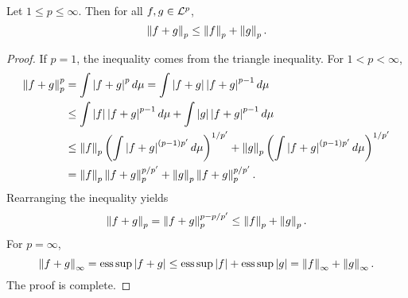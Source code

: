 \begin{theorem}
    Let $1\leq p\leq\infty$. Then for all $f,g\in\mathcal{L}^p$, 
    \begin{equation*}
        \left\lVert {f+g} \right\rVert_p \leq \left\lVert {f} \right\rVert_p + \left\lVert {g} \right\rVert_p.
    \end{equation*}
\end{theorem}
\begin{proof}
    If $p = 1$, the inequality comes from the triangle inequality. 
    For $1<p<\infty$, 
    \begin{equation*}
        \begin{split}
            \norm{f+g}_p^p &= \int \abs{f+g}^pd\mu 
            = \int \abs{f+g}\abs{f+g}^{p-1}d\mu \\
            &\leq \int \abs{f}\abs{f+g}^{p-1}d\mu + \int \abs{g}\abs{f+g}^{p-1}d\mu \\
            &\leq \norm{f}_p\pth{\int \abs{f+g}^{(p-1)p'}d\mu}^{1/p'} + \norm{g}_p\pth{\int \abs{f+g}^{(p-1)p'}d\mu}^{1/p'} \\
            &= \norm{f}_p\norm{f+g}_p^{p/p'} + \norm{g}_p\norm{f+g}_p^{p/p'}.
        \end{split}
    \end{equation*}
    Rearranging the inequality yields 
    \begin{equation*}
        \left\lVert {f+g} \right\rVert_p = \left\lVert {f+g} \right\rVert_p^{p-p/p'} \leq \left\lVert {f} \right\rVert_p + \left\lVert {g} \right\rVert_p.
    \end{equation*}
    For $p = \infty$, 
    \begin{equation*}
        \left\lVert {f+g} \right\rVert_\infty = \operatorname{ess\,sup} \left\lvert {f+g} \right\rvert \leq \operatorname{ess\,sup} \left\lvert {f} \right\rvert + \operatorname{ess\,sup} \left\lvert {g} \right\rvert = \left\lVert {f} \right\rVert_\infty + \left\lVert {g} \right\rVert_\infty.
    \end{equation*}
    The proof is complete.
\end{proof}

